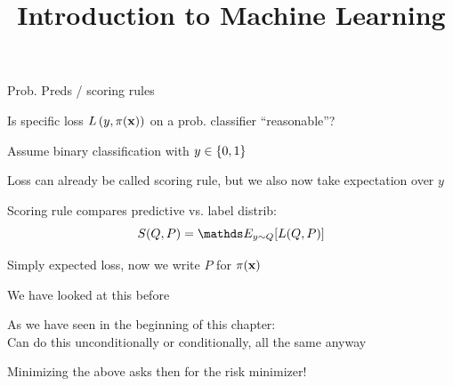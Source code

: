 \documentclass[11pt,compress,t,notes=noshow, xcolor=table]{beamer}
\title{Introduction to Machine Learning}
\begin{document}
    

\begin{vbframe}{Prob. Preds / scoring rules }

\begin{itemizeM}
\item Is specific loss $L\left(y, \pi(\mathbf{x})\right)$ on a prob. classifier ``reasonable''?
\item Assume binary classification with $y \in \{0, 1\}$
\item Loss can already be called scoring rule, but we also now take expectation over $y$
\item Scoring rule compares predictive vs. label distrib: 
$$ S(Q, P) = \E_{y \sim Q}[L(Q, P)]$$
\item Simply expected loss, now we write $P$ for $\pi(\mathbf{x})$
\item We have looked at this before
\item As we have seen in the beginning of this chapter:\\ 
Can do this unconditionally or conditionally, all the same anyway
\item Minimizing the above asks then for the risk minimizer!


\end{itemizeM}

\end{vbframe}
\end{document}
